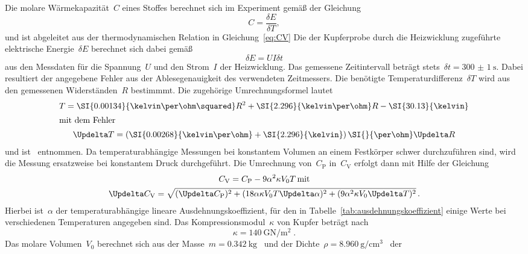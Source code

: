 Die molare Wärmekapazität~$C$ eines Stoffes berechnet sich im Experiment gemäß
der Gleichung
%
\begin{equation}
  C=\frac{\delta E}{\delta T},
\end{equation}
%
und ist abgeleitet aus der thermodynamischen Relation in Gleichung~\eqref{eq:CV}
Die der Kupferprobe durch die Heizwicklung zugeführte elektrische
Energie~$\delta E$ berechnet sich dabei gemäß
%
\begin{equation}
  \delta E = UI\delta t
\end{equation}
%
aus den Messdaten für die Spannung~$U$ und den Strom~$I$ der Heizwicklung. Das
gemessene Zeitintervall beträgt stets~$\delta t=\SI{300(1)}{\second}$. Dabei
resultiert der angegebene Fehler aus der Ablesegenauigkeit des verwendeten
Zeitmessers. Die benötigte Temperaturdifferenz~$\delta T$ wird aus den
gemessenen Widerständen~$R$ bestimmmt. Die zugehörige Umrechnungsformel lautet
%
\begin{gather}
  T=\SI{0.00134}{\kelvin\per\ohm\squared}R^2+\SI{2.296}{\kelvin\per\ohm}R-\SI{30.13}{\kelvin} \\
  \shortintertext{mit dem Fehler}
  \Updelta T=\left(\SI{0.00268}{\kelvin\per\ohm}+\SI{2.296}{\kelvin}\right)\SI{}{\per\ohm}\Updelta R
\end{gather}
%
und ist~\cite{V47} entnommen. Da temperaturabhängige Messungen bei konstantem
Volumen an einem Festkörper schwer durchzuführen sind, wird die Messung
ersatzweise bei konstantem Druck durchgeführt. Die Umrechnung
von~$C_{\mathrm{P}}$ in~$C_{\mathrm{V}}$ erfolgt dann mit Hilfe der Gleichung
%
\begin{gather}
  C_{\mathrm{V}}=C_{\mathrm{P}}-9\alpha^2\kappa V_0T\label{eq:Cp2Cv}\,\text{mit} \\
  \Updelta C_{\mathrm{V}}=\sqrt{(\Updelta C_{\mathrm{P}})^2+(18\alpha\kappa V_0T\Updelta\alpha)^2+(9\alpha^2\kappa V_0\Updelta T)^2}\, .
\end{gather}
%
Hierbei ist~$\alpha$ der temperaturabhängige lineare Ausdehnungskoeffizient, für
den in Tabelle~\ref{tab:ausdehnungskoeffizient} einige Werte bei verschiedenen
Temperaturen angegeben sind. Das Kompressionsmodul~$\kappa$ von Kupfer beträgt
nach~\cite{mathematica}
%
\begin{equation}
  \kappa=\SI{140}{\giga\newton\per\metre\squared} \; .
\end{equation}
%
Das molare Volumen~$V_0$ berechnet sich aus der
Masse~$m=\SI{0.342}{\kilo\gram}$~\cite{V47} und der
Dichte~$\rho=\SI{8.960}{\gram\per\centi\metre\cubed}$~\cite{mathematica} der
